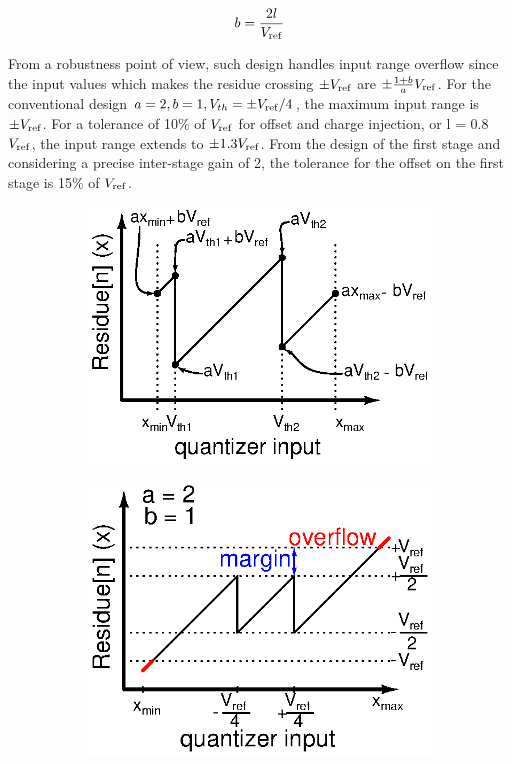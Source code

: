 \begin{equation}
b = \frac{2l}{V_{\rm ref}}
\end{equation}

From a robustness point of view, such design handles input range overflow since the input values which makes the residue crossing \(\pm V_{\rm ref}\) are \(\pm \frac{1+b}{a}V_{\rm ref}\). For the conventional design \(a=2, b=1, V_{th}=\pm V_{\rm ref}/4\), the maximum input range is \(\pm V_{\rm ref}\). For a tolerance of 10\% of \(V_{\rm ref}\) for offset and charge injection, or l = 0.8 \(V_{\rm ref}\), the input range extends to \(\pm 1.3 V_{\rm ref}\). From the design of the first stage and considering a precise inter-stage gain of 2, the tolerance for the offset on the first stage is 15\% of \(V_{\rm ref}\). 

\begin{figure}[htp]
	\centering
	\begin{subfigure}[b]{0.32\textwidth}
		\centering
		\includegraphics[width=\textwidth]{Chapter4/Figs/3-levels-pattern-algo.ps}
		\label{fig:algo-general}
	\end{subfigure}
	\begin{subfigure}[b]{0.32\textwidth}
		\centering
		\includegraphics[width=\textwidth]{Chapter4/Figs/3-levels-pattern-algo-2-1.ps}

\end{subfigure}
\end{figure}
